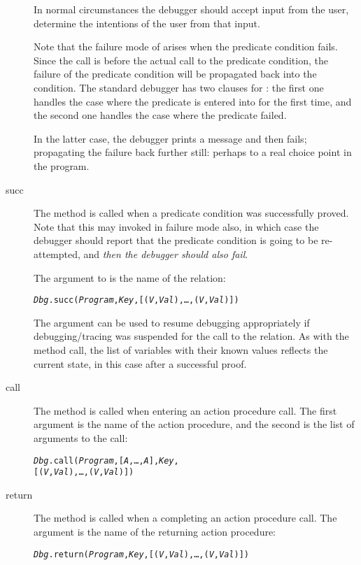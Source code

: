 \begin{description}
In normal circumstances the debugger should accept input from the user, determine the intentions of the user from that input.

Note that the failure mode of  arises when the predicate condition fails. Since the  call is before the actual call to the predicate condition, the failure of the predicate condition will be propagated back into the  condition. The standard debugger has two clauses for : the first one handles the case where the predicate is entered into for the first time, and the second one handles the case where the predicate failed.

In the latter case, the debugger prints a message and then fails; propagating the failure back further still: perhaps to a real choice point in the program.

\item[succ]
The  method is called when a predicate condition was successfully proved.  Note that this may invoked in failure mode also, in which case the debugger should report that the predicate condition is going to be re-attempted, and \emph{then the debugger should also fail}.

The argument to  is the name of the relation:
\begin{alltt}
\emph{Dbg}.succ(\emph{Program},\emph{Key},[(\emph{V},\emph{Val}),\ldots,(\emph{V\subn},\emph{Val\subn})])
\end{alltt}
The  argument can be used to resume debugging appropriately if debugging/tracing was suspended for the call to the relation. As with the  method call, the list of variables with their known values reflects the current state, in this case after a successful proof.

\item[call]
The  method is called when entering an action procedure call. The first argument is the name of the action procedure, and the second is the list of arguments to the call:
\begin{alltt}
\emph{Dbg}.call(\emph{Program},[\emph{A},\ldots,\emph{A\subn}],\emph{Key},
         [(\emph{V},\emph{Val}),\ldots,(\emph{V\subn},\emph{Val\subn})])
\end{alltt}

\item[return]
The  method is called when a completing an action procedure call. The argument is the name of the returning action procedure:
\begin{alltt}
\emph{Dbg}.return(\emph{Program},\emph{Key},[(\emph{V},\emph{Val}),\ldots,(\emph{V\subn},\emph{Val\subn})])
\end{alltt}


\end{description}
